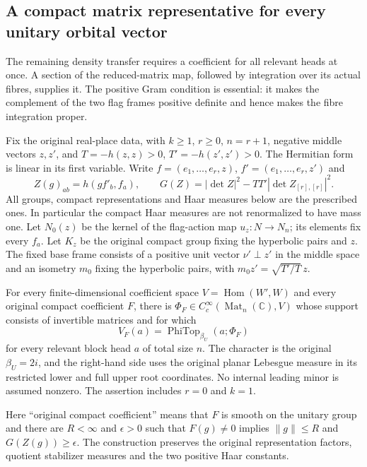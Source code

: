 \subsection{A compact matrix representative for every unitary orbital vector}
\label{actual-unitary-density}

The remaining density transfer requires a coefficient for all relevant
heads at once.  A section of the reduced-matrix map, followed by
integration over its actual fibres, supplies it.  The positive Gram
condition is essential: it makes the complement of the two flag frames
positive definite and hence makes the fibre integration proper.

Fix the original real-place data, with $k\ge1$, $r\ge0$, $n=r+1$,
negative middle vectors $z,z'$, and
$T=-h(z,z)>0$, $T'=-h(z',z')>0$.  The Hermitian form is linear in
its first variable.  Write $f=(e_1,\ldots,e_r,z)$,
$f'=(e_1,\ldots,e_r,z')$ and
\[
 Z(g)_{ab}=h(gf'_b,f_a),\qquad
 G(Z)=|\det Z|^2-TT'|\det Z_{[r],[r]}|^2.
\]
All groups, compact representations and Haar measures below are the
prescribed ones.  In particular the compact Haar measures are not
renormalized to have mass one.  Let $N_0(z)$ be the kernel of the
flag-action map $u_z:N\to N_n$; its elements fix every $f_a$.
Let $K_z$ be the original compact group fixing the hyperbolic pairs
and $z$.  The fixed base frame consists of a positive unit vector
$\nu'\perp z'$ in the middle space and an isometry $m_0$ fixing
the hyperbolic pairs, with $m_0z'=\sqrt{T'/T}\,z$.

\begin{theorem}\label{unitary-density-compact-representative}
For every finite-dimensional coefficient space
$V=\operatorname{Hom}(W',W)$ and every original compact coefficient
$F$, there is $\Phi_F\in C_c^\infty(\operatorname{Mat}_n(\mathbb C),V)$
whose support consists of invertible matrices and for which
\begin{equation}\label{unitary-density-orbital-identity}
       V_F(a)=\operatorname{PhiTop}_{\beta_U}(a;\Phi_F)
\end{equation}
for every relevant block head $a$ of total size $n$.
The character is the original $\beta_U=2i$, and the right-hand side
uses the original planar Lebesgue measure in its restricted lower
and full upper root coordinates.  No internal leading minor is
assumed nonzero.  The assertion includes $r=0$ and $k=1$.

Here ``original compact coefficient'' means that $F$ is smooth on
the unitary group and there are $R<\infty$ and $\epsilon>0$ such
that $F(g)\ne0$ implies $\|g\|\le R$ and $G(Z(g))\ge\epsilon$.
The construction preserves the original representation factors,
quotient stabilizer measures and the two positive Haar constants.
\end{theorem}

